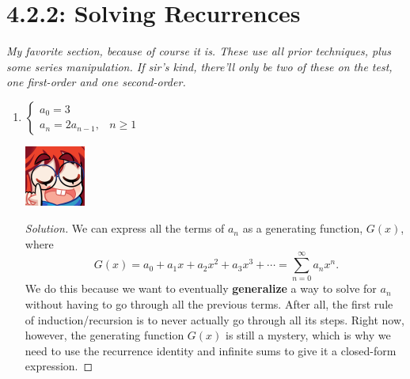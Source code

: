 \documentclass{article}
\newenvironment{solution}
  {\renewcommand\qedsymbol{$\blacksquare$}\begin{proof}[Solution]}
  {\end{proof}}
\begin{document}
\section*{4.2.2: Solving Recurrences}
\textit{My favorite section, because of course it is. These use all prior techniques, plus some series manipulation. If sir's kind, there'll only be two of these on the test, one first-order and one second-order.}
\begin{enumerate} 
    \item $\begin{cases} a_0 = 3 & \\ a_n = 2a_{n-1}, & n\geq 1 \end{cases}$\par
    \begin{minipage}[t]{.14\textwidth}
        \vspace{0pt}
        \includegraphics[width=2cm]{nerd_maddy.png} 
    \end{minipage}%
    \begin{solution} 
        We can express all the terms of $a_n$ as a generating function, $G(x)$, where \[\
            G(x) = a_0 + a_1 x + a_2 x^2 + a_3 x^3 + \cdots = \displaystyle{} \sum_{n=0}^\infty a_n x^n .
        \] We do this because we want to eventually \textbf{generalize} a way to solve for $a_n$ without having to go through all the previous terms. After 
        all, the first rule of induction/recursion is to never actually go through all its steps. Right now, however, the generating function $G(x)$ is still a mystery, which is why
        we need to use the recurrence identity and infinite sums to give it a closed-form expression.\par 

\end{solution}
\end{enumerate}
\end{document}
